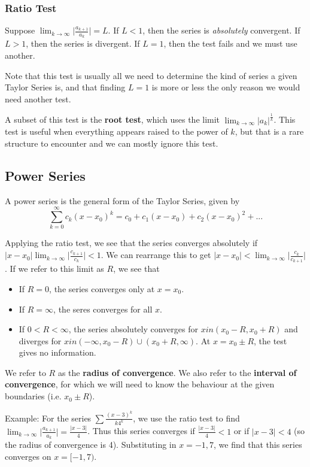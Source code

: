 \documentclass[12pt]{article}
\begin{document}
\subsubsection*{Ratio Test}
Suppose $\displaystyle\lim_{k\to\infty} \bigg|\frac{a_{k+1}}{a_k}\bigg| = L$. If $L < 1$, then the series is \emph{absolutely} convergent. If $L > 1$, then the series is divergent. If $L = 1$, then the test fails and we must use another.

Note that this test is usually all we need to determine the kind of series a given Taylor Series is, and that finding $L = 1$ is more or less the only reason we would need another test.

A subset of this test is the {\bf root test}, which uses the limit $\displaystyle\lim_{k\to\infty} {|a_k|}^\frac{1}{k}$. This test is useful when everything appears raised to the power of $k$, but that is a rare structure to encounter and we can mostly ignore this test.

\subsection*{Power Series}
A power series is the general form of the Taylor Series, given by \[ \sum_{k=0}^\infty c_k (x - x_0)^k = c_0 + c_1(x-x_0) + c_2(x-x_0)^2 + ... \]

Applying the ratio test, we see that the series converges absolutely if $|x - x_0| \displaystyle\lim_{k\to\infty} \bigg|\frac{c_{k+1}}{c_k}\bigg| < 1$. We can rearrange this to get $|x - x_0| < \displaystyle\lim_{k\to\infty} \bigg|\frac{c_k}{c_{k+1}}\bigg|$. If we refer to this limit as $R$, we see that
\begin{itemize}
\item If $R = 0$, the series converges only at $x = x_0$.
\item If $R = \infty$, the seres converges for all $x$.
\item If $0 < R < \infty$, the series absolutely converges for $x in (x_0 - R, x_0 + R)$ and diverges for $x in (-\infty,x_0 - R) \cup (x_0 + R, \infty)$. At $x = x_0 \pm R$, the test gives no information.
\end{itemize}

We refer to $R$ as the {\bf radius of convergence}. We also refer to the {\bf interval of convergence}, for which we will need to know the behaviour at the given boundaries (i.e. $x_0 \pm R$).

Example: For the series $\sum \frac{(x-3)^k}{k4^k}$, we use the ratio test to find $\displaystyle\lim_{k\to\infty} \bigg|\frac{a_{k+1}}{a_k}\bigg| = \frac{|x-3|}{4}$. Thus this series converges if $
\frac{|x-3|}{4} < 1$ or if $|x-3| < 4$ (so the radius of convergence is 4). Substituting in $x = -1, 7$, we find that this series converges on $x = [-1, 7)$.
\end{document}

